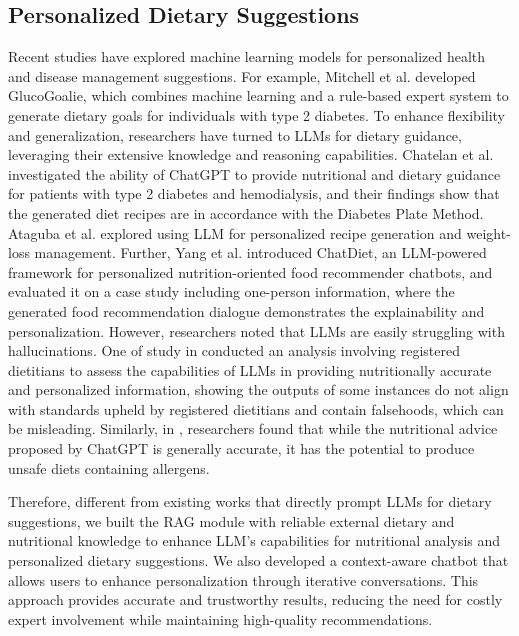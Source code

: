 \subsection{Personalized Dietary Suggestions}
Recent studies have explored machine learning models for personalized health and disease management suggestions. 
For example, Mitchell et al. \cite{g2021reflection} developed GlucoGoalie, which combines machine learning and a rule-based expert system to generate dietary goals for individuals with type 2 diabetes. 
To enhance flexibility and generalization, researchers have turned to LLMs for dietary guidance, leveraging their extensive knowledge and reasoning capabilities.
Chatelan et al. \cite{dietaryguidance1} investigated the ability of ChatGPT to provide nutritional and dietary guidance for patients with type 2 diabetes and hemodialysis, and their findings show that the generated diet recipes are in accordance with the Diabetes Plate Method. Ataguba et al. \cite{ataguba2025exploring} explored using LLM for personalized recipe generation and weight-loss management. Further, Yang et al. \cite{dietaryguidance2} introduced ChatDiet, an LLM-powered framework for personalized nutrition-oriented food recommender chatbots, and evaluated it on a case study including one-person information, where the generated food recommendation dialogue demonstrates the explainability and personalization. 
However, researchers noted that LLMs are easily struggling with hallucinations. One of study in \cite{szymanski2024integrating} conducted an analysis involving registered dietitians to assess the capabilities of LLMs in providing nutritionally accurate and personalized information, showing the outputs of some instances do not align with standards upheld by registered dietitians and contain falsehoods, which can be misleading.
Similarly, in \cite{llmnutritionlimitation1}, researchers found that while the nutritional advice proposed by ChatGPT is generally accurate, it has the potential to produce unsafe diets containing allergens.


Therefore, different from existing works that directly prompt LLMs for dietary suggestions, we built the RAG module with reliable external dietary and nutritional knowledge to enhance LLM's capabilities for nutritional analysis and personalized dietary suggestions. We also developed a context-aware chatbot that allows users to enhance personalization through iterative conversations.
This approach provides accurate and trustworthy results, reducing the need for costly expert involvement while maintaining high-quality recommendations.


